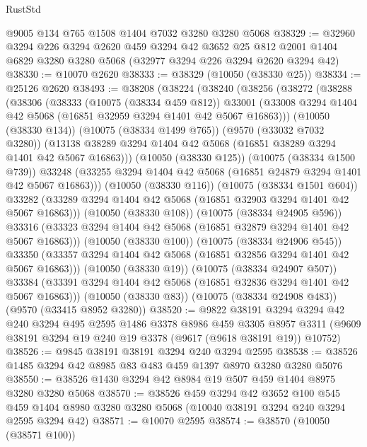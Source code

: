 \begin{lexlean}{RustStd}
\begin{coremodule}
    @9005
    @134
    @765
    @1508
    @1404
    @7032
    @3280
    @3280
    @5068
@38329 := @32960
    @3294
    @226
    @3294
    @2620
    @459
    @3294
    @42
    @3652
    @25
    @812
    @2001
    @1404
    @6829
    @3280
    @3280
    @5068
    (@32977 @3294 @226 @3294 @2620 @3294 @42)
@38330 := @10070 @2620
@38333 := @38329 (@10050 (@38330 @25))
@38334 := @25126 @2620
@38493 := @38208
    (@38224
      (@38240
        (@38256
          (@38272
            (@38288
              (@38306
                (@38333
                  (@10075 (@38334 @459 @812))
                  @33001
                  (@33008 @3294 @1404 @42 @5068 (@16851 @32959 @3294 @1401 @42 @5067 @16863)))
                (@10050 (@38330 @134))
                (@10075 (@38334 @1499 @765))
                (@9570 (@33032 @7032 @3280))
                (@13138 @38289 @3294 @1404 @42 @5068 (@16851 @38289 @3294 @1401 @42 @5067 @16863)))
              (@10050 (@38330 @125))
              (@10075 (@38334 @1500 @739))
              @33248
              (@33255 @3294 @1404 @42 @5068 (@16851 @24879 @3294 @1401 @42 @5067 @16863)))
            (@10050 (@38330 @116))
            (@10075 (@38334 @1501 @604))
            @33282
            (@33289 @3294 @1404 @42 @5068 (@16851 @32903 @3294 @1401 @42 @5067 @16863)))
          (@10050 (@38330 @108))
          (@10075 (@38334 @24905 @596))
          @33316
          (@33323 @3294 @1404 @42 @5068 (@16851 @32879 @3294 @1401 @42 @5067 @16863)))
        (@10050 (@38330 @100))
        (@10075 (@38334 @24906 @545))
        @33350
        (@33357 @3294 @1404 @42 @5068 (@16851 @32856 @3294 @1401 @42 @5067 @16863)))
      (@10050 (@38330 @19))
      (@10075 (@38334 @24907 @507))
      @33384
      (@33391 @3294 @1404 @42 @5068 (@16851 @32836 @3294 @1401 @42 @5067 @16863)))
    (@10050 (@38330 @83))
    (@10075 (@38334 @24908 @483))
    (@9570 (@33415 @8952 @3280))
@38520 := @9822
    @38191
    @3294
    @3294
    @42
    @240
    @3294
    @495
    @2595
    @1486
    @3378
    @8986
    @459
    @3305
    @8957
    @3311
    (@9609 @38191 @3294 @19 @240 @19 @3378 (@9617 (@9618 @38191 @19)) @10752)
@38526 := @9845 @38191 @38191 @3294 @240 @3294 @2595
@38538 := @38526 @1485 @3294 @42 @8985 @83 @483 @459 @1397 @8970 @3280 @3280 @5076
@38550 := @38526 @1430 @3294 @42 @8984 @19 @507 @459 @1404 @8975 @3280 @3280 @5068
@38570 := @38526
    @459
    @3294
    @42
    @3652
    @100
    @545
    @459
    @1404
    @8980
    @3280
    @3280
    @5068
    (@10040 @38191 @3294 @240 @3294 @2595 @3294 @42)
@38571 := @10070 @2595
@38574 := @38570 (@10050 (@38571 @100))

\end{coremodule}
\end{lexlean}
